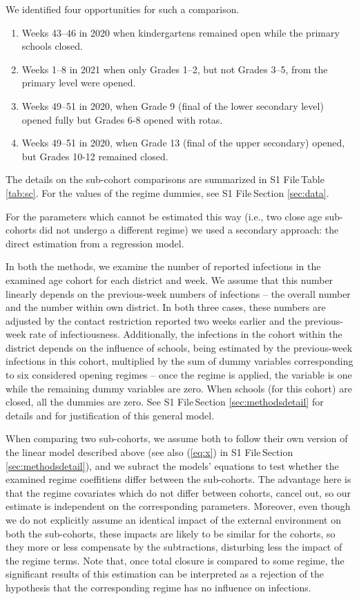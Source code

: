 \documentclass[fleqn,10pt]{wlscirep}
\def\supfile{S1 File\,}
\begin{document}
We identified four opportunities for such a comparison. 
\begin{enumerate}
\item Weeks 43--46 in 2020 when kindergartens remained open while the primary schools closed.
\item Weeks 1--8 in 2021 when only Grades 1--2, but not Grades 3--5,  from the primary level were opened.
\item Weeks 49--51 in 2020, when Grade 9 (final of the lower secondary level) opened fully but Grades 6-8 opened with rotas.
\item Weeks 49--51 in 2020, when Grade 13 (final of the upper secondary) opened, but Grades 10-12 remained closed. 
\end{enumerate}



The details on the sub-cohort comparisons are summarized in \supfile Table \ref{tab:sc}. For the values of the regime dummies, see \supfile Section \ref{sec:data}.

For the parameters which cannot be estimated this way (i.e., two close age sub-cohorts did not undergo a different regime) we used a secondary approach: the direct estimation from a regression model. 

In both the methods, we examine the number of reported infections in the examined age cohort for each district and week. We assume that this number linearly depends on the previous-week numbers of infections -- the overall number and the number within own district.
In both three cases, these numbers are adjusted by the contact restriction reported two weeks earlier and the previous-week rate of infectiousness. Additionally, the infections in the cohort within the district depends on the influence of schools, being estimated by the previous-week infections in this cohort, multiplied by the sum of dummy variables corresponding to six considered opening regimes -- once the regime is applied, the variable is one while the remaining dummy variables are zero. When schools (for this cohort) are closed, all the dummies are zero. See \supfile Section \ref{sec:methodsdetail} for details and for justification of this general model.     

When comparing two sub-cohorts, we assume both to follow their own version of the linear model described above (see also (\ref{eq:x}) in \supfile Section \ref{sec:methodsdetail}), and we subract the models' equations to test whether the examined regime coeffitiens differ between the sub-cohorts. The advantage here is that the regime covariates which do not differ between cohorts, cancel out, so our estimate is independent on the corresponding parameters. Moreover, even though we do not explicitly assume an identical impact of the external environment on both the sub-cohorts, these impacts are likely to be similar for the cohorts, so they more or less compensate by the subtractions, disturbing less the impact of the regime terms. Note that, once total closure is compared to some regime, the significant results of this estimation can be interpreted as a rejection of the hypothesis that the corresponding regime has no influence on infections.  
\end{document}

